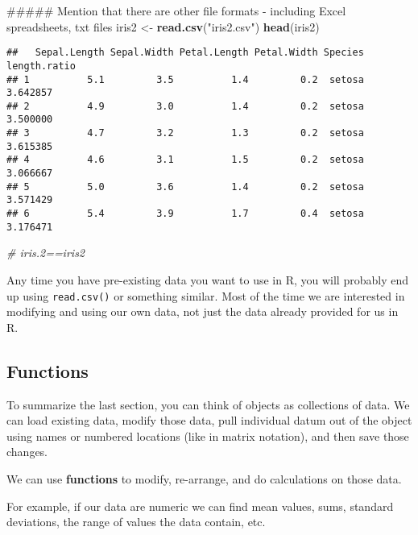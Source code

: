 \documentclass[]{article}
\newenvironment{Shaded}{\begin{snugshade}}{\end{snugshade}}
\newcommand{\KeywordTok}[1]{\textcolor[rgb]{0.13,0.29,0.53}{\textbf{#1}}}
\newcommand{\StringTok}[1]{\textcolor[rgb]{0.31,0.60,0.02}{#1}}
\newcommand{\CommentTok}[1]{\textcolor[rgb]{0.56,0.35,0.01}{\textit{#1}}}
\newcommand{\NormalTok}[1]{#1}
\begin{document}
\begin{Shaded}
\begin{Highlighting}[]
\NormalTok{##### Mention that there are other file formats - including Excel spreadsheets, txt files}
\NormalTok{iris2 <-}\StringTok{ }\KeywordTok{read.csv}\NormalTok{(}\StringTok{"iris2.csv"}\NormalTok{)}
\KeywordTok{head}\NormalTok{(iris2)}
\end{Highlighting}
\end{Shaded}

\begin{verbatim}
##   Sepal.Length Sepal.Width Petal.Length Petal.Width Species length.ratio
## 1          5.1         3.5          1.4         0.2  setosa     3.642857
## 2          4.9         3.0          1.4         0.2  setosa     3.500000
## 3          4.7         3.2          1.3         0.2  setosa     3.615385
## 4          4.6         3.1          1.5         0.2  setosa     3.066667
## 5          5.0         3.6          1.4         0.2  setosa     3.571429
## 6          5.4         3.9          1.7         0.4  setosa     3.176471
\end{verbatim}

\begin{Shaded}
\begin{Highlighting}[]
\CommentTok{# iris.2==iris2 }
\end{Highlighting}
\end{Shaded}

Any time you have pre-existing data you want to use in R, you will
probably end up using \texttt{read.csv()} or something similar. Most of
the time we are interested in modifying and using our own data, not just
the data already provided for us in R.

\subsection{Functions}\label{functions}

To summarize the last section, you can think of objects as collections
of data. We can load existing data, modify those data, pull individual
datum out of the object using names or numbered locations (like in
matrix notation), and then save those changes.

We can use \textbf{functions} to modify, re-arrange, and do calculations
on those data.

For example, if our data are numeric we can find mean values, sums,
standard deviations, the range of values the data contain, etc.
\end{document}
